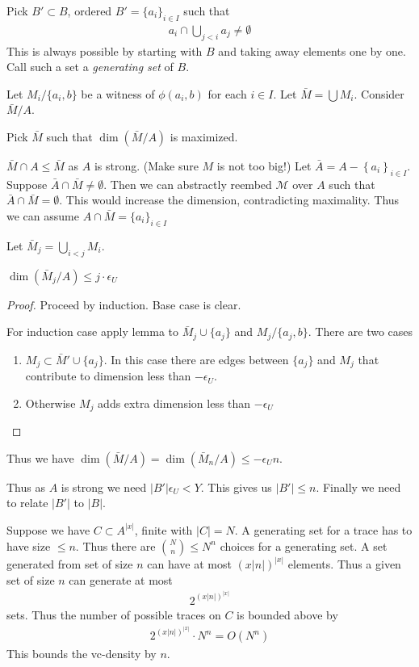 \documentclass{amsart}
\newcommand{\M}{\mathcal M}
\newcommand{\curly}[1]{\left\{#1\right\}}
\begin{document}
Pick $B' \subset B$, ordered $B' = \{a_i\}_{i \in I}$ such that
\begin{align*}
	a_i \cap \bigcup_{j < i} a_j \neq \emptyset
\end{align*}
This is always possible by starting with $B$ and taking away elements one by one.
Call such a set a \emph{generating set} of $B$.

Let $M_i / \{a_i, b\}$ be a witness of $\phi(a_i, b)$ for each $i \in I$.
Let $\bar M = \bigcup M_i$.
Consider $\bar M / A$.

Pick $\bar M$ such that $\dim(\bar M / A)$ is maximized.

$\bar M \cap A \leq \bar M$ as $A$ is strong. (Make sure $M$ is not too big!)
Let $\bar A = A - \curly{a_i}_{i \in I}$.
Suppose $\bar A \cap \bar M \neq \emptyset$.
Then we can abstractly reembed $\M$ over $A$ such that $\bar A \cap \bar M = \emptyset$.
This would increase the dimension, contradicting maximality.
Thus we can assume $A \cap \bar M = \{a_i\}_{i \in I}$

Let $\bar M_j = \bigcup_{i < j} M_i$.

\begin{Lemma}
	$\dim(\bar M_j / A) \leq j \cdot \epsilon_U$
\end{Lemma}
\begin{proof}
	Proceed by induction.
	Base case is clear.

	For induction case apply lemma to $\bar M_j \cup \{a_j\}$ and $M_j / \{a_j, b\}$.
	There are two cases
	\begin{enumerate}
		\item $M_j \subset \bar M' \cup \{a_j\}$.
		In this case there are edges between $\{a_j\}$ and $M_j$ that contribute to dimension less than $-\epsilon_U$.
		\item Otherwise $M_j$ adds extra dimension less than $-\epsilon_U$
	\end{enumerate}
\end{proof}

Thus we have $\dim(\bar M / A) = \dim(\bar M_n / A) \leq -\epsilon_U n$.

Thus as $A$ is strong we need $|B'| \epsilon_U < Y$.
This gives us $|B'| \leq n$.
Finally we need to relate $|B'|$ to $|B|$.

Suppose we have $C \subset A^{|x|}$, finite with $|C| = N$.
A generating set for a trace has to have size $\leq n$.
Thus there are ${N \choose n} \leq N^n$ choices for a generating set.
A set generated from set of size $n$ can have at most $(x|n|)^{|x|}$ elements.
Thus a given set of size $n$ can generate at most
\begin{align*}
	2^{(x|n|)^{|x|}}
\end{align*}
sets.
Thus the number of possible traces on $C$ is bounded above by
\begin{align*}
  2^{(x|n|)^{|x|}} \cdot N^n = O(N^n)
\end{align*}
This bounds the vc-density by $n$.
\end{document}
